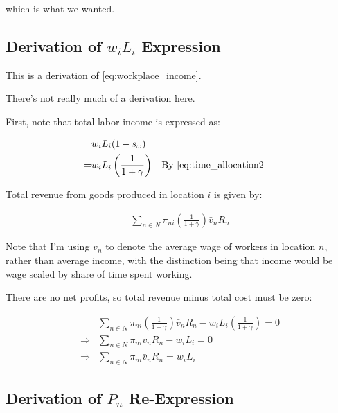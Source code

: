 \documentclass[10pt]{article}
\begin{document}
which is what we wanted.

\subsection{Derivation of $w_i L_i$ Expression}
\label{sec:workplace_income}

This is a derivation of \eqref{eq:workplace_income}.

There's not really much of a derivation here. 

First, note that total labor income is expressed as:

\begin{align}
    &w_i L_i (1- s_\omega) \\
    = &w_i L_i \left(\frac{1}{1+\gamma}\right) && \text{By \eqref{eq:time_allocation2}}
\end{align}

Total revenue from goods produced in location $i$ is given by:

\begin{align}
    \sum_{n \in N} \pi_{n i} \left(\frac{1}{1+\gamma}\right) \bar{v}_n R_n
\end{align}

Note that I'm using $\bar{v}_n$ to denote the average 
wage of workers in location $n$, rather than 
average income, with the distinction being that 
income would be wage scaled by share of time spent working.

There are no net profits, so 
total revenue minus total cost must be zero:

\begin{align}
    &\sum_{n \in N} \pi_{n i} \left(\frac{1}{1+\gamma}\right) \bar{v}_n R_n - w_i L_i \left(\frac{1}{1+\gamma}\right) = 0 \\
    \Rightarrow &\sum_{n \in N} \pi_{n i} \bar{v}_n R_n - w_i L_i = 0 \\
    \Rightarrow &\sum_{n \in N} \pi_{n i} \bar{v}_n R_n = w_i L_i
\end{align}


\subsection{Derivation of $P_n$ Re-Expression}
\label{sec:price_ni_2}
\end{document}
